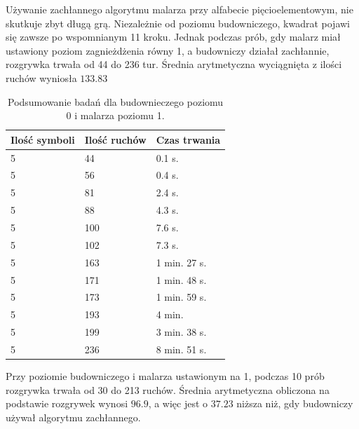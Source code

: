 \documentclass[document]{xmgr}
\begin{document}
Używanie zachłannego algorytmu malarza przy alfabecie pięcioelementowym,  nie skutkuje zbyt długą grą. Niezależnie od poziomu budowniczego, kwadrat pojawi się zawsze po wspomnianym 11 kroku. Jednak podczas prób, gdy malarz miał ustawiony poziom zagnieżdżenia równy 1, a budowniczy działał zachłannie, rozgrywka trwała od 44 do 236 tur. Średnia arytmetyczna wyciągnięta z ilości ruchów wyniosła $133.83$

\begin{table}[tbh]
    \centering
	\begin{tabular}{|l|l|l|} \hline
	Ilość symboli & Ilość ruchów & Czas trwania \\ \hline
	5 & 44 & 0.1 s.\\ \hline
	5 & 56 & 0.4 s.\\ \hline
	5 & 81 & 2.4 s.\\ \hline
	5 & 88 & 4.3 s.\\ \hline
	5 & 100 & 7.6 s.\\ \hline
	5 & 102 & 7.3 s.\\ \hline
	5 & 163 & 1 min. 27 s. \\ \hline
	5 & 171 & 1 min. 48 s. \\ \hline
	5 & 173 & 1 min. 59 s. \\ \hline
	5 & 193 & 4 min. \\ \hline
	5 & 199 & 3 min. 38 s.\\ \hline
	5 & 236 & 8 min. 51 s. \\ \hline
	\end{tabular}
	\caption{Podsumowanie badań dla budownieczego poziomu 0 i malarza poziomu 1.}
	\label{fig:builder0Painter1Table}
\end{table}


Przy poziomie budowniczego i malarza ustawionym na 1, podczas 10 prób rozgrywka trwała od 30 do 213 ruchów. Średnia arytmetyczna obliczona na podstawie rozgrywek wynosi $96.9$, a więc jest o $37.23$ niższa niż, gdy budowniczy używał algorytmu zachłannego. 
\end{document}
